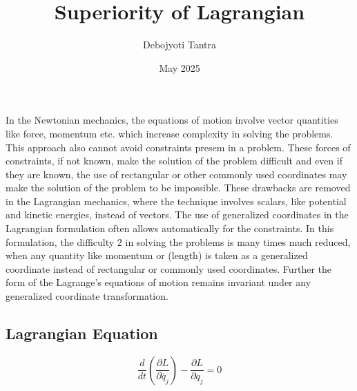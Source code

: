 \documentclass[a4paper,12pt]{article}
\title{Superiority of Lagrangian}
\author{Debojyoti Tantra}
\date{May 2025}
\begin{document}

\section*{}

    \quad In the Newtonian mechanics, the equations of motion involve vector quantities like force, momentum etc. which increase complexity in solving the problems. This approach also cannot avoid constraints presem in a problem. These forces of constraints, if not known, make the solution of the problem difficult and even if they are known, the use of rectangular or other commonly used coordinates may make the solution of the problem to be impossible. These drawbacks are removed in the Lagrangian mechanics, where the technique involves scalars, like potential and kinetic energies, instead of vectors. The use of generalized coordinates in the Lagrangian formulation often allows automatically for the constraints. In this formulation, the difficulty 2 in solving the problems is many times much reduced, when any quantity like momentum or (length) is taken as a generalized coordinate instead of rectangular or commonly used coordinates. Further the form of the Lagrange's equations of motion remains invariant under any generalized coordinate transformation.

    \subsection*{Lagrangian Equation}
        \begin{equation}
            \frac{d}{dt} \left( \frac{\partial L}{\partial \dot{q_j}} \right) -  \frac{\partial L}{\partial q_j} = 0
        \end{equation}
\end{document}
